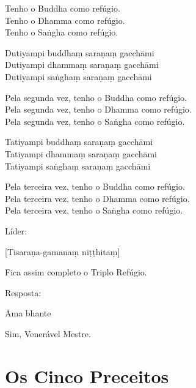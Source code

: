{\begin{english}
  Tenho o Buddha como refúgio.\\
  Tenho o Dhamma como refúgio.\\
  Tenho o Saṅgha como refúgio.
\end{english}

Dutiyampi buddhaṃ saraṇaṃ gacchāmi\\
Dutiyampi dhammaṃ saraṇaṃ gacchāmi\\
Dutiyampi saṅghaṃ saraṇaṃ gacchāmi

\begin{english}
  Pela segunda vez, tenho o Buddha como refúgio.\\
  Pela segunda vez, tenho o Dhamma como refúgio.\\
  Pela segunda vez, tenho o Saṅgha como refúgio.
\end{english}

Tatiyampi buddhaṃ saraṇaṃ gacchāmi\\
Tatiyampi dhammaṃ saraṇaṃ gacchāmi\\
Tatiyampi saṅghaṃ saraṇaṃ gacchāmi

\begin{english}
  Pela terceira vez, tenho o Buddha como refúgio.\\
  Pela terceira vez, tenho o Dhamma como refúgio.\\
  Pela terceira vez, tenho o Saṅgha como refúgio.
\end{english}

\begin{instruction}
  Líder:
\end{instruction}

[Tisaraṇa-gamanaṃ niṭṭhitaṃ]

\begin{english}
  Fica assim completo o Triplo Refúgio.
\end{english}

\begin{instruction}
  Resposta:
\end{instruction}

Āma bhante

\begin{english}
  Sim, Venerável Mestre.
\end{english}

\section{Os Cinco Preceitos}

}
